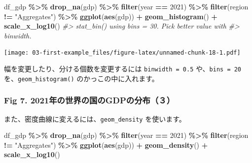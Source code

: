 \documentclass[
  xelatex, ja=standard]{bxjsbook}
\newenvironment{Shaded}{\begin{snugshade}}{\end{snugshade}}
\newcommand{\CommentTok}[1]{\textcolor[rgb]{0.56,0.35,0.01}{\textit{#1}}}
\newcommand{\DecValTok}[1]{\textcolor[rgb]{0.00,0.00,0.81}{#1}}
\newcommand{\FunctionTok}[1]{\textcolor[rgb]{0.13,0.29,0.53}{\textbf{#1}}}
\newcommand{\NormalTok}[1]{#1}
\newcommand{\SpecialCharTok}[1]{\textcolor[rgb]{0.81,0.36,0.00}{\textbf{#1}}}
\newcommand{\StringTok}[1]{\textcolor[rgb]{0.31,0.60,0.02}{#1}}
\theoremstyle{definition}
\theoremstyle{definition}
\theoremstyle{definition}
\theoremstyle{definition}
\theoremstyle{remark}
\begin{document}
\begin{Shaded}
\begin{Highlighting}[]
\NormalTok{df\_gdp }\SpecialCharTok{\%\textgreater{}\%} \FunctionTok{drop\_na}\NormalTok{(gdp) }\SpecialCharTok{\%\textgreater{}\%} 
  \FunctionTok{filter}\NormalTok{(year }\SpecialCharTok{==} \DecValTok{2021}\NormalTok{) }\SpecialCharTok{\%\textgreater{}\%} \FunctionTok{filter}\NormalTok{(region }\SpecialCharTok{!=} \StringTok{"Aggregates"}\NormalTok{) }\SpecialCharTok{\%\textgreater{}\%}
  \FunctionTok{ggplot}\NormalTok{(}\FunctionTok{aes}\NormalTok{(gdp)) }\SpecialCharTok{+} \FunctionTok{geom\_histogram}\NormalTok{() }\SpecialCharTok{+} \FunctionTok{scale\_x\_log10}\NormalTok{()}
\CommentTok{\#\textgreater{} \textasciigrave{}stat\_bin()\textasciigrave{} using \textasciigrave{}bins = 30\textasciigrave{}. Pick better value with}
\CommentTok{\#\textgreater{} \textasciigrave{}binwidth\textasciigrave{}.}
\end{Highlighting}
\end{Shaded}

\texttt{[image: 03-first-example\_files/figure-latex/unnamed-chunk-18-1.pdf]}

幅を変更したり、分ける個数を変更するには \texttt{binwidth\ =\ 0.5} や、\texttt{bins\ =\ 20} を、\texttt{geom\_histogram()} のかっこの中に入れます。

\hypertarget{fig-7.-2021ux5e74ux306eux4e16ux754cux306eux56fdux306egdpux306eux5206ux5e03uxff13}{%
\subsubsection{Fig 7. 2021年の世界の国のGDPの分布（３）}\label{fig-7.-2021ux5e74ux306eux4e16ux754cux306eux56fdux306egdpux306eux5206ux5e03uxff13}}

また、密度曲線に変えるには、\texttt{geom\_density} を使います。

\begin{Shaded}
\begin{Highlighting}[]
\NormalTok{df\_gdp }\SpecialCharTok{\%\textgreater{}\%} \FunctionTok{drop\_na}\NormalTok{(gdp) }\SpecialCharTok{\%\textgreater{}\%} 
  \FunctionTok{filter}\NormalTok{(year }\SpecialCharTok{==} \DecValTok{2021}\NormalTok{) }\SpecialCharTok{\%\textgreater{}\%} \FunctionTok{filter}\NormalTok{(region }\SpecialCharTok{!=} \StringTok{"Aggregates"}\NormalTok{) }\SpecialCharTok{\%\textgreater{}\%}
  \FunctionTok{ggplot}\NormalTok{(}\FunctionTok{aes}\NormalTok{(gdp)) }\SpecialCharTok{+} \FunctionTok{geom\_density}\NormalTok{() }\SpecialCharTok{+} \FunctionTok{scale\_x\_log10}\NormalTok{()}
\end{Highlighting}
\end{Shaded}
\end{document}
